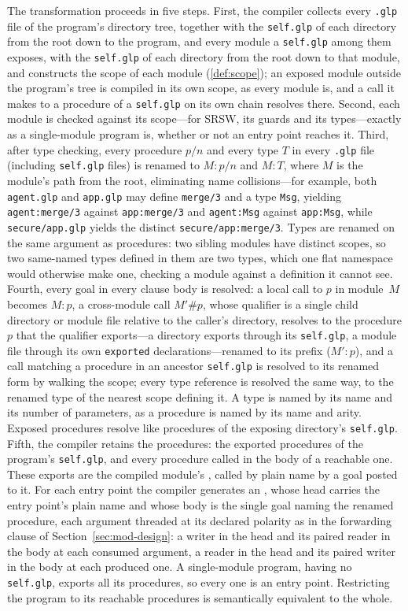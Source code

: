 The transformation proceeds in five steps.  First, the compiler collects every \verb|.glp| file of the program's directory tree, together with the \verb|self.glp| of each directory from the root down to the program, and every module a \verb|self.glp| among them exposes, with the \verb|self.glp| of each directory from the root down to that module, and constructs the scope of each module (\cref{def:scope}); an exposed module outside the program's tree is compiled in its own scope, as every module is, and a call it makes to a procedure of a \verb|self.glp| on its own chain resolves there.  Second, each module is checked against its scope---for SRSW, its guards and its types---exactly as a single-module program is, whether or not an entry point reaches it.  Third, after type checking, every procedure $p/n$ and every type $T$ in every \verb|.glp| file (including \verb|self.glp| files) is renamed to $M{:}p/n$ and $M{:}T$, where $M$ is the module's path from the root, eliminating name collisions---for example, both \verb|agent.glp| and \verb|app.glp| may define \verb|merge/3| and a type \verb|Msg|, yielding \verb|agent:merge/3| against \verb|app:merge/3| and \verb|agent:Msg| against \verb|app:Msg|, while \verb|secure/app.glp| yields the distinct \verb|secure/app:merge/3|.  Types are renamed on the same argument as procedures: two sibling modules have distinct scopes, so two same-named types defined in them are two types, which one flat namespace would otherwise make one, checking a module against a definition it cannot see.  Fourth, every goal in every clause body is resolved: a local call to $p$ in module~$M$ becomes $M{:}p$, a cross-module call $M'\#p$, whose qualifier is a single child directory or module file relative to the caller's directory, resolves to the procedure $p$ that the qualifier exports---a directory exports through its \verb|self.glp|, a module file through its own \verb|exported| declarations---renamed to its prefix ($M'{:}p$), and a call matching a procedure in an ancestor \verb|self.glp| is resolved to its renamed form by walking the scope; every type reference is resolved the same way, to the renamed type of the nearest scope defining it.  A type is named by its name and its number of parameters, as a procedure is named by its name and arity.  Exposed procedures resolve like procedures of the exposing directory's \verb|self.glp|.  Fifth, the compiler retains the  procedures: the exported procedures of the program's \verb|self.glp|, and every procedure called in the body of a reachable one.  These exports are the compiled module's , called by plain name by a goal posted to it.  For each entry point the compiler generates an , whose head carries the entry point's plain name and whose body is the single goal naming the renamed procedure, each argument threaded at its declared polarity as in the forwarding clause of Section~\ref{sec:mod-design}: a writer in the head and its paired reader in the body at each consumed argument, a reader in the head and its paired writer in the body at each produced one.  A single-module program, having no \verb|self.glp|, exports all its procedures, so every one is an entry point.  Restricting the program to its reachable procedures is semantically equivalent to the whole.

